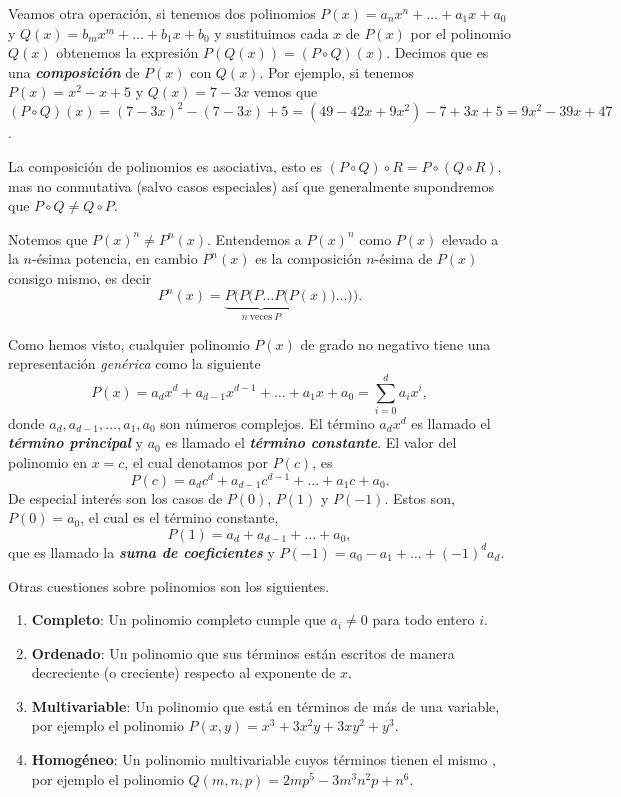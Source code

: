 Veamos otra operación, si tenemos dos polinomios $P(x) = a_n x^n + \ldots + a_1 x + a_0$ y $Q(x) = b_m x^m + \ldots + b_1 x + b_0$ y sustituimos cada $x$ de $P(x)$ por el polinomio $Q(x)$ obtenemos la expresión $P\left(Q(x)\right) = (P \circ Q)(x)$.
Decimos que es una \textbf{\emph{composición}} de $P(x)$ con $Q(x)$.
Por ejemplo, si tenemos $P(x) = x^2 - x + 5$ y $Q(x) = 7 - 3x$ vemos que $(P \circ Q)(x) = (7 - 3x)^2 - (7 - 3x) + 5 = (49 - 42x + 9x^2) - 7 + 3x + 5 = 9x^2 - 39x + 47$.

La composición de polinomios es asociativa, esto es $(P \circ Q) \circ R = P \circ (Q \circ R)$, mas no conmutativa (salvo casos especiales) así que generalmente supondremos que $P \circ Q \neq  Q \circ P$.
\\
\begin{remark.tcb}
    Notemos que $P(x)^n \neq P^n(x)$.
    Entendemos a $P(x)^n$ como $P(x)$ elevado a la $n$-ésima potencia, en cambio $P^n(x)$ es la composición $n$-ésima de $P(x)$ consigo mismo, es decir
    \[
        P^n(x) = \underbrace{P(P(P\dots P(P}_{n\ \text{veces}\ P} (x))\dots)).
    \]
\end{remark.tcb}

Como hemos visto, cualquier polinomio $P(x)$ de grado no negativo tiene una representación \textit{genérica} como la siguiente
\[
    P(x) = a_d x^d + a_{d - 1} x^{d - 1} + \ldots + a_1 x + a_0 = \sum_{i = 0}^{d} a_i x^i,
\]
donde $a_d, a_{d - 1}, \ldots, a_1, a_0$ son números complejos.
El término $a_d x^d$ es llamado el \textbf{\emph{término principal}} y $a_0$ es llamado el \textbf{\emph{término constante}}.
El valor del polinomio en $x = c$, el cual denotamos por $P(c)$, es
\[
    P(c) = a_d c^d + a_{d - 1}c^{d - 1} + \ldots + a_1 c + a_0.
\]
De especial interés son los casos de $P(0)$, $P(1)$ y $P(-1)$.
Estos son, $P(0) = a_0$, el cual es el término constante,
\[
    P(1) = a_d + a_{d - 1} + \ldots + a_0,
\]
que es llamado la \textbf{\emph{suma de coeficientes}} y $P(-1) = a_0 - a_1 + \ldots + (-1)^d a_d.$

Otras cuestiones sobre polinomios son los siguientes.
\begin{enumerate}
    \item \textbf{Completo}: Un polinomio completo cumple que $a_i \neq 0$ para todo entero $i$.
    \item \textbf{Ordenado}: Un polinomio que sus términos están escritos de manera decreciente (o creciente) respecto al exponente de $x$.
    \item \textbf{Multivariable}: Un polinomio que está en términos de más de una variable, por ejemplo el polinomio $P(x, y) = x^3 + 3x^2 y + 3xy^2 + y^3$.
    \item \textbf{Homogéneo}: Un polinomio multivariable cuyos términos tienen el mismo , por ejemplo el polinomio $Q(m, n, p) = 2m p^5 - 3m^3 n^2 p + n^6$.
\end{enumerate}


